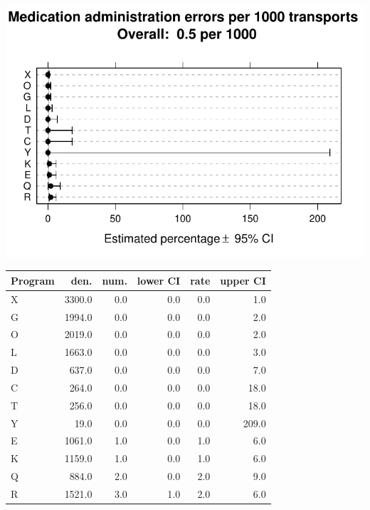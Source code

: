 \documentclass[twoside]{article}\usepackage[]{graphicx}\usepackage[]{color}
\makeatletter
\def\maxwidth{ %
  \ifdim\Gin@nat@width>\linewidth
    \linewidth
  \else
    \Gin@nat@width
  \fi
}
\newenvironment{knitrout}{}{} %
\makeatother
\begin{document}
\begin{center}
\begin{knitrout}
\color{fgcolor}
\includegraphics[width=\maxwidth]{figure/r_med_errors} 

\end{knitrout}

\end{center}

\begin{table}[ht]
\centering
\begin{tabular}{lrrrrr}
  \hline
Program & den. & num. & lower CI & rate & upper CI \\ 
  \hline
X & 3300.0 & 0.0 & 0.0 & 0.0 & 1.0 \\ 
  G & 1994.0 & 0.0 & 0.0 & 0.0 & 2.0 \\ 
  O & 2019.0 & 0.0 & 0.0 & 0.0 & 2.0 \\ 
  L & 1663.0 & 0.0 & 0.0 & 0.0 & 3.0 \\ 
  D & 637.0 & 0.0 & 0.0 & 0.0 & 7.0 \\ 
  C & 264.0 & 0.0 & 0.0 & 0.0 & 18.0 \\ 
  T & 256.0 & 0.0 & 0.0 & 0.0 & 18.0 \\ 
  Y & 19.0 & 0.0 & 0.0 & 0.0 & 209.0 \\ 
  E & 1061.0 & 1.0 & 0.0 & 1.0 & 6.0 \\ 
  K & 1159.0 & 1.0 & 0.0 & 1.0 & 6.0 \\ 
  Q & 884.0 & 2.0 & 0.0 & 2.0 & 9.0 \\ 
  R & 1521.0 & 3.0 & 1.0 & 2.0 & 6.0 \\ 
   \hline
\end{tabular}
\end{table}
\end{document}
